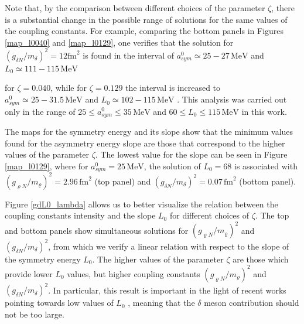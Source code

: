 \documentclass[twocolumn,showpacs,aps]{revtex4}
\begin{document}
Note that, by the comparison between different choices of the parameter $\zeta$, there is a substantial change in the possible 
range of solutions for the same values of the coupling constants. 
For example, comparing the bottom panels in Figures \ref{map_l0040} and \ref{map_l0129}, one verifies that the solution for 
$(g_{\delta N}/m_{\delta})^2 = 12 \mathrm{fm}^{2}$
  is found in the interval of $a_{sym}^0\simeq 25-27\, \mathrm{MeV}$
  and $L_0\simeq 111-115\, \mathrm{MeV}$
  
for $\zeta=0.040$, while for $\zeta=0.129$ the interval is increased to $a_{sym}^0\simeq 25-31.5\, \mathrm{MeV}$
  and $L_0\simeq 102-115\, \mathrm{MeV}$
 .
This analysis was carried out only in the range of $25 \leq a_{sym}^0\leq 35\, \mathrm{MeV}$
  and $60 \leq L_0 \leq 115 \, \mathrm{MeV}$
  in this work. 

The maps for the symmetry energy and its slope show that the minimum values found for the asymmetry energy slope are those that correspond 
to the higher values of the parameter $\zeta$. The lowest value for the slope can be seen in Figure \ref{map_l0129}, 
where for $a_{sym}^0=25 \,\mathrm{MeV}$, the solution of $L_0=68$ is associated with $(g_{\varrho N}/m_{\varrho})^2=2.96\,\mathrm{fm}^{2}$
  (top panel) and
$(g_{\delta N}/m_{\delta})^2=0.07\,\mathrm{fm}^{2}$ (bottom panel). 


Figure \ref{gdL0_lambda} allows us to better visualize the relation between the coupling constants intensity and the slope $L_0$
for different choices of $\zeta$.
The top and bottom panels show simultaneous solutions for $(g_{\varrho N}/m_{\varrho})^2$ and $(g_{\delta N}/m_{\delta})^2$, 
from which we verify a linear relation with respect to the slope of the symmetry energy $L_0$. 
The higher values of the parameter $\zeta$ are those which provide lower $L_0$ values, but higher 
coupling constants $(g_{\varrho N}/m_{\varrho})^2$ and $(g_{\delta N}/m_{\delta})^2$.
In particular, this result is important in the light of recent works pointing towards low values of $L_0$ \cite{Hebeler:2013nza},
meaning that the $\delta$ meson contribution should not be too large.
\end{document}
